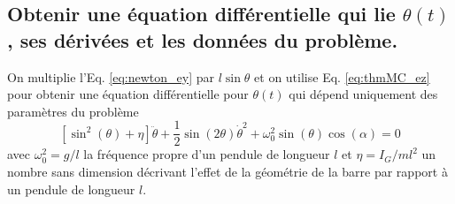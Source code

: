 \documentclass[11pt,a4paper]{exam}
\begin{document}
\begin{parts}
\part{Obtenir une équation différentielle qui lie $\theta(t)$, ses dérivées et les données du problème.}
    \par\vspace{2mm}
    On multiplie l'Eq. \eqref{eq:newton_ey} par $l\sin\theta$ et on utilise Eq. \eqref{eq:thmMC_ez} pour obtenir une équation différentielle pour $\theta(t)$ qui dépend uniquement des paramètres du problème
    \begin{equation}
        \left[\sin^2(\theta) +\eta\right]\ddot\theta +\frac{1}{2}\sin(2\theta)\dot\theta^2 + \omega_0^2\sin(\theta) \cos(\alpha) = 0 \label{eq:Eqdumvt}
    \end{equation}
    avec $\omega_0^2=g/l$ la fréquence propre d'un pendule de longueur $l$ et $\eta=I_G/ml^2$ un nombre sans dimension décrivant l'effet de la géométrie de la barre par rapport à un pendule de longueur $l$. 

\end{parts}
\end{document}
